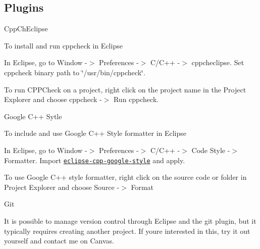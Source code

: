 \subsection*{Plugins}


\begin{DoxyItemize}
\item Cpp\+Ch\+Eclipse

To install and run cppcheck in Eclipse
\begin{DoxyEnumerate}
\item In Eclipse, go to Window -\/$>$ Preferences -\/$>$ C/\+C++ -\/$>$ cppcheclipse. Set cppcheck binary path to \char`\"{}/usr/bin/cppcheck\char`\"{}.
\item To run C\+P\+P\+Check on a project, right click on the project name in the Project Explorer and choose cppcheck -\/$>$ Run cppcheck.
\end{DoxyEnumerate}
\item Google C++ Sytle

To include and use Google C++ Style formatter in Eclipse
\begin{DoxyEnumerate}
\item In Eclipse, go to Window -\/$>$ Preferences -\/$>$ C/\+C++ -\/$>$ Code Style -\/$>$ Formatter. Import \href{https://raw.githubusercontent.com/google/styleguide/gh-pages/eclipse-cpp-google-style.xml}{\tt eclipse-\/cpp-\/google-\/style} and apply.
\item To use Google C++ style formatter, right click on the source code or folder in Project Explorer and choose Source -\/$>$ Format
\end{DoxyEnumerate}
\item Git

It is possible to manage version control through Eclipse and the git plugin, but it typically requires creating another project. If you\textquotesingle{}re interested in this, try it out yourself and contact me on Canvas. 
\end{DoxyItemize}